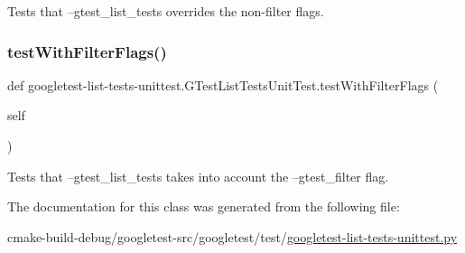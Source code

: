 \begin{DoxyVerb}Tests that --gtest_list_tests overrides the non-filter flags.\end{DoxyVerb}
 \mbox{\label{classgoogletest-list-tests-unittest_1_1GTestListTestsUnitTest_adb60d2295fee8ed4af2a5ee1a32e5778}} 
\subsubsection{\texorpdfstring{testWithFilterFlags()}{testWithFilterFlags()}}
{\footnotesize\ttfamily def googletest-\/list-\/tests-\/unittest.\+G\+Test\+List\+Tests\+Unit\+Test.\+test\+With\+Filter\+Flags (\begin{DoxyParamCaption}\item[{}]{self }\end{DoxyParamCaption})}

\begin{DoxyVerb}Tests that --gtest_list_tests takes into account the
--gtest_filter flag.\end{DoxyVerb}
 

The documentation for this class was generated from the following file\+:\begin{DoxyCompactItemize}
\item 
cmake-\/build-\/debug/googletest-\/src/googletest/test/\mbox{\hyperlink{googletest-list-tests-unittest_8py}{googletest-\/list-\/tests-\/unittest.\+py}}\end{DoxyCompactItemize}
